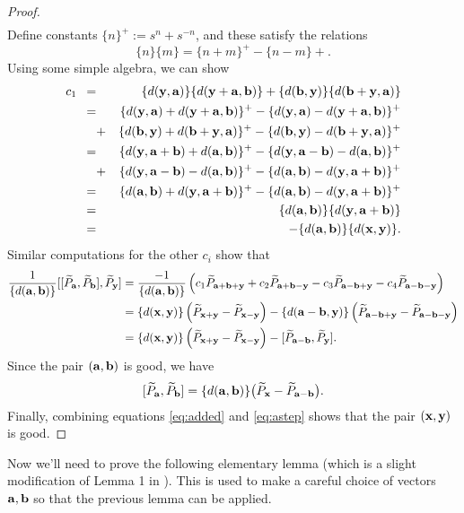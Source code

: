 \begin{proof}
\begin{eqnarray*}
	\end{eqnarray*}
Define constants $\{n\}^+ := s^n + s^{-n}$, and these satisfy the relations
\[
\{n\}\{m\} = \{n+m\}^+ - \{n-m\}+.
\]
Using some simple algebra, we can show
	\begin{eqnarray*}
c_1 \,\,\, =& &  \{d(\yy,\aab)\} \{d(\yy+\aab,\bb)\} + \{d(\bb,\yy)\} \{d(\bb+\yy,\aab)\} \\
=&& \{d(\yy,\aab)+d(\yy+\aab,\bb)\}^+ - \{d(\yy,\aab)-d(\yy+\aab,\bb)\}^+ \\
&+& \{d(\bb,\yy)+d(\bb+\yy,\aab)\}^+ - \{d(\bb,\yy)-d(\bb+\yy,\aab)\}^+  \\
=&& \{d(\yy,\aab+\bb)+d(\aab,\bb)\}^+ - \{d(\yy,\aab-\bb)-d(\aab,\bb)\}^+ \\
&+& \{d(\yy,\aab-\bb)-d(\aab,\bb)\}^+ - \{d(\aab,\bb)-d(\yy,\aab+\bb)\}^+ \\
=&& \{d(\aab,\bb)+d(\yy,\aab+\bb)\}^+ - \{d(\aab,\bb)-d(\yy,\aab+\bb)\}^+ \\
=&& \{d(\aab,\bb)\} \{d(\yy,\aab+\bb)\} \\
=&& - \{d(\aab,\bb)\} \{d(\xx,\yy)\}.
	\end{eqnarray*}
Similar computations for the other $c_i$ show that 
	\begin{align}
\frac{1}{\{d(\aab,\bb)\}}[[\widetilde{P}_\aab,\widetilde{P}_\bb],\widetilde{P}_\yy] &=  \frac{-1}{\{d(\aab,\bb)\}} \left( c_1 \widetilde{P}_{\aab+\bb+\yy} + c_2 \widetilde{P}_{\aab+\bb-\yy} - c_3 \widetilde{P}_{\aab-\bb+\yy} - c_4 \widetilde{P}_{\aab-\bb-\yy}\right) \notag\\ 
&=  \{d(\xx,\yy)\} \left( \widetilde{P}_{\xx+\yy} - \widetilde{P}_{\xx-\yy} \right) 
-\{d(\aab-\bb,\yy)\} \left( \widetilde{P}_{\aab-\bb+\yy} - \widetilde{P}_{\aab-\bb-\yy} \right)\notag \\
&= \{d(\xx,\yy)\} \left( \widetilde{P}_{\xx+\yy} - \widetilde{P}_{\xx-\yy} \right) 
- [\widetilde{P}_{\aab-\bb},\widetilde{P}_\yy]. \label{eq:astep}
	\end{align}
	Since the pair $(\aab,\bb)$ is good, we have 
\begin{equation}\label{eq:added}
[\widetilde{P}_{\aab}, \widetilde{P}_{\bb}] = \{d(\aab, \bb )\} \big( \widetilde{P}_{\xx} - \widetilde{P}_{\aab-\bb} \big).
\end{equation}
Finally, combining equations \eqref{eq:added} and \eqref{eq:astep} shows that the pair $(\xx,\yy)$ is good.
\end{proof}

Now we'll need to prove the following elementary lemma (which is a slight modification of Lemma 1 in \cite{FG00}). This is used to make a careful choice of vectors $\aab, \bb$ so that the previous lemma can be applied. 

